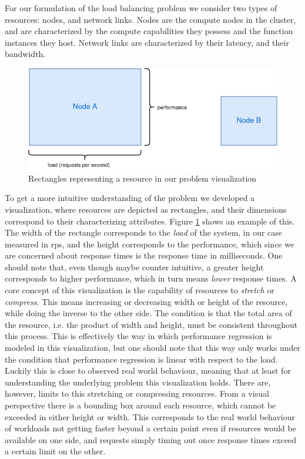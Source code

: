 For our formulation of the load balancing problem we consider two types of resources: nodes, and network links. Nodes are the compute nodes in the cluster, and are characterized by the compute capabilities they possess and the function instances they host. Network links are characterized by their latency, and their bandwidth.
\begin{figure}
    \centering
    \includegraphics[width=12cm]{graphics/diagrams/load_balancer_squares.png}
    \caption{Rectangles representing a resource in our problem visualization}
    \label{fig:lb_squares_basic}
\end{figure}
To get a more intuitive understanding of the problem we developed a visualization, where resources are depicted as rectangles, and their dimensions correspond to their characterizing attributes. Figure \ref{fig:lb_squares_basic} shows an example of this. The width of the rectangle corresponds to the \textit{load} of the system, in our case measured in \gls{rps}, and the height corresponds to the performance, which since we are concerned about response times is the response time in milliseconds. One should note that, even though maybe counter intuitive, a greater height corresponds to higher performance, which in turn means \textit{lower} response times.
A core concept of this visualization is the capability of resources to \textit{stretch} or \textit{compress}. This means increasing or decreasing width or height of the resource, while doing the inverse to the other side. The condition is that the total area of the resource, i.e. the product of width and height, must be consistent throughout this process. This is effectively the way in which performance regression is modeled in this visualization, but one should note that this way only works under the condition that performance regression is linear with respect to the load. Luckily this is close to observed real world behaviour, %
meaning that at least for understanding the underlying problem this visualization holds.
There are, however, limits to this stretching or compressing resources. From a visual perspective there is a bounding box around each resource, which cannot be exceeded in either height or width. This corresponds to the real world behaviour of workloads not getting faster beyond a certain point even if resources would be available on one side, and requests simply timing out once response times exceed a certain limit on the other.
